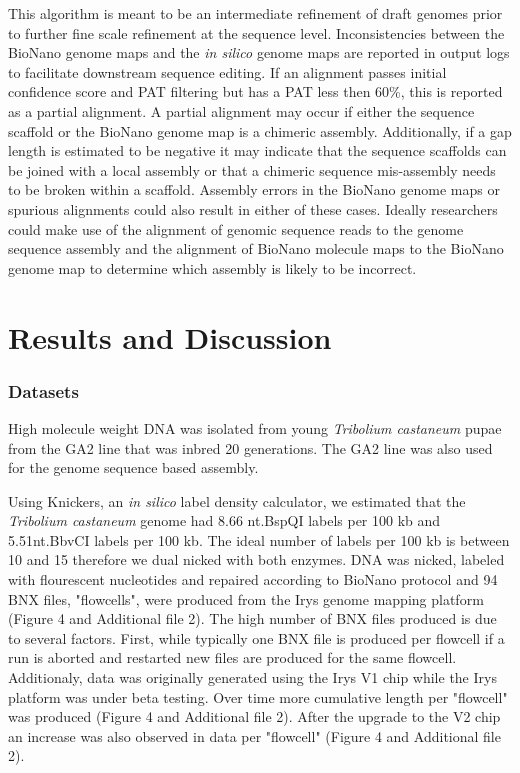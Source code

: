 \documentclass{bmcart}
\begin{document}
This algorithm is meant to be an intermediate refinement of draft genomes prior to further fine scale refinement at the sequence level. Inconsistencies between the BioNano genome maps and the \textit{in silico} genome maps are reported in output logs to facilitate downstream sequence editing. If an alignment passes initial confidence score and PAT filtering but has a PAT less then 60\%, this is reported as a partial alignment. A partial alignment may occur if either the sequence scaffold or the BioNano genome map is a chimeric assembly. Additionally, if a gap length is estimated to be negative it may indicate that the sequence scaffolds can be joined with a local assembly or that a chimeric sequence mis-assembly needs to be broken within a scaffold. Assembly errors in the BioNano genome maps or spurious alignments could also result in either of these cases. Ideally researchers could make use of the alignment of genomic sequence reads to the genome sequence assembly and the alignment of BioNano molecule maps to the BioNano genome map to determine which assembly is likely to be incorrect.
 
\section*{Results and Discussion}

\subsubsection*{Datasets}
High molecule weight DNA was isolated from young \textit{Tribolium castaneum} pupae from the GA2 line that was inbred 20 generations. The GA2 line was also used for the genome sequence based assembly.

Using Knickers, an \textit{in silico} label density calculator, we estimated that the \textit{Tribolium castaneum} genome had 8.66 nt.BspQI labels per 100 kb and 5.51nt.BbvCI labels per 100 kb. The ideal number of labels per 100 kb is between 10 and 15 therefore we dual nicked with both enzymes. DNA was nicked, labeled with flourescent nucleotides and repaired according to BioNano protocol and 94 BNX files, "flowcells", were produced from the Irys genome mapping platform (Figure 4 and Additional file 2). The high number of BNX files produced is due to several factors. First, while typically one BNX file is produced per flowcell if a run is aborted and restarted new files are produced for the same flowcell. Additionaly, data was originally generated using the Irys V1 chip while the Irys platform was under beta testing. Over time more cumulative length per "flowcell" was produced (Figure 4 and Additional file 2). After the upgrade to the V2 chip an increase was also observed in data per "flowcell" (Figure 4 and Additional file 2).
\end{document}

